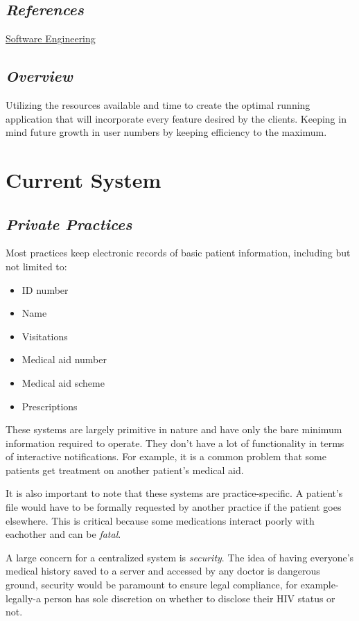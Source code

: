 \documentclass[a4paper]{article}
\begin{document}
\subsection{\textit{References}}

\href{ https://cle.wits.ac.za/access/content/group/COMS3009_2016/book-SE_marsic.pdf}{Software Engineering}
		
\subsection{\textit{Overview}}

Utilizing the resources available and time to create the optimal running application that will incorporate every feature desired by the clients. Keeping in mind future growth in user numbers by keeping efficiency to the maximum.

\section{Current System}
\subsection{\textit{Private Practices}}
Most practices keep electronic records of basic patient information, including but not limited to:
\begin{itemize}
	\item ID number
	\item Name
	\item Visitations
	\item Medical aid number
	\item Medical aid scheme
	\item Prescriptions
\end{itemize}
These systems are largely primitive in nature and have only the bare minimum information required to operate. They don't have a lot of functionality in terms of interactive notifications. For example, it is a common problem that some patients get treatment on another patient's medical aid.

It is also important to note that these systems are practice-specific. A patient's file would have to be formally requested by another practice if the patient goes elsewhere. This is critical because some medications interact poorly with eachother and can be \emph{fatal}.

A large concern for a centralized system is \emph{security}. The idea of having everyone's medical history saved to a server and accessed by any doctor is dangerous ground, security would be paramount to ensure legal compliance, for example-legally-a person has sole discretion on whether to disclose their HIV status or not.
\end{document}
